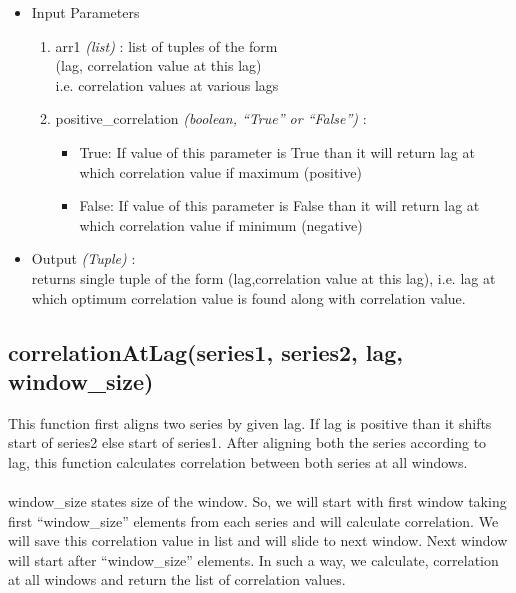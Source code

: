 \begin{itemize}
 \item Input Parameters
 
 \begin{enumerate}
  \item arr1 \textit{(list)} : list of tuples of the form \\ (lag, correlation 
value at this lag) \\ i.e. correlation values at various lags
  \item positive\_correlation \textit{(boolean, ``True'' or ``False'')} : 
      \begin{itemize}
       \item True: If value of this parameter is True than it will return lag 
at which correlation value if maximum (positive)
       \item False: If value of this parameter is False than it will return lag 
at which correlation value if minimum (negative)
      \end{itemize}

 \end{enumerate}

 \item Output \textit{(Tuple)} : \\
  returns single tuple of the form (lag,correlation value at this lag), i.e. 
lag at which optimum correlation value is found along with correlation value.
 
\end{itemize}


\subsection{correlationAtLag(series1, series2, lag, window\_size)}

This function first aligns two series by given lag. If lag is positive than it 
shifts start of series2 else start of series1. After aligning both the series 
according to lag, this function calculates correlation between both series at 
all windows. \\
\\
window\_size states size of the window. So, we will start with first window 
taking first ``window\_size'' elements from each series and will calculate 
correlation. We will save this correlation value in list and will slide to next 
window. Next window will start after ``window\_size'' elements. In such a way, we 
calculate, correlation at all windows and return the list of correlation values.\\


